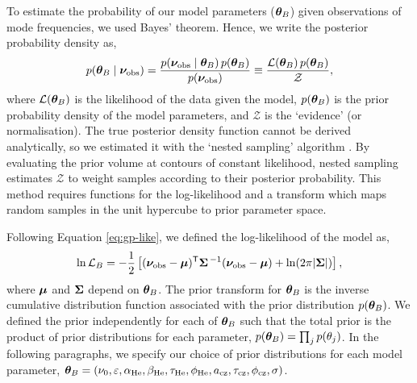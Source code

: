 To estimate the probability of our model parameters (\(\bm{\theta}_B\)) given observations of mode frequencies, we used Bayes' theorem. Hence, we write the posterior probability density as, 
%
\begin{equation}
    p(\bm{\theta}_B \mid \bm{\nu}_{{\mathrm{obs}}}) = \frac{p(\bm{\nu}_{{\mathrm{obs}}} \mid \bm{\theta}_B)\,p(\bm{\theta}_B)}{p(\bm{\nu}_{{\mathrm{obs}}})} \equiv \frac{\mathcal{L}(\bm{\theta}_B)\,p(\bm{\theta}_B)}{\mathcal{Z}},
\end{equation}
%
where \(\mathcal{L}(\bm{\theta}_B)\) is the likelihood of the data given the model, \(p(\bm{\theta}_B)\) is the prior probability density of the model parameters, and \(\mathcal{Z}\) is the `evidence' (or normalisation). The true posterior density function cannot be derived analytically, so we estimated it with the `nested sampling' algorithm \citep{Skilling2004}. By evaluating the prior volume at contours of constant likelihood, nested sampling estimates \(\mathcal{Z}\) to weight samples according to their posterior probability. This method requires functions for the log-likelihood and a transform which maps random samples in the unit hypercube to prior parameter space. 

Following Equation \ref{eq:gp-like}, we defined the log-likelihood of the model as,
%
\begin{equation}
    \ln\mathcal{L}_B = - \frac12 \left[ {(\bm{\nu}_{{\mathrm{obs}}} - \bm{\mu})^\mathsf{T} \bm{\Sigma}^{\,-1} (\bm{\nu}_{{\mathrm{obs}}} - \bm{\mu})} + \ln(2 \pi | \bm{\Sigma} | ) \right],
\end{equation}
%
where \(\bm{\mu}\) and \(\bm{\Sigma}\) depend on \(\bm{\theta}_B\). The prior transform for \(\bm{\theta}_B\) is the inverse cumulative distribution function associated with the prior distribution \(p(\bm{\theta}_B)\). We defined the prior independently for each of \(\bm{\theta}_B\) such that the total prior is the product of prior distributions for each parameter, \(p(\bm{\theta}_B) = \prod_j p(\theta_{j})\). In the following paragraphs, we specify our choice of prior distributions for each model parameter, \(\bm{\theta}_B = (\nu_0, \varepsilon, \alpha_{{\mathrm{He}}}, \beta_{{\mathrm{He}}}, \tau_{{\mathrm{He}}}, \phi_{{\mathrm{He}}}, a_{{\mathrm{cz}}}, \tau_{{\mathrm{cz}}}, \phi_{{\mathrm{cz}}}, \sigma)\).

